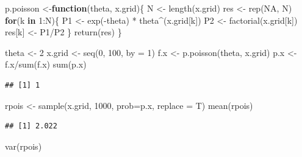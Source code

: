 \documentclass[
  10pt,
  spanish,
]{book}
\newenvironment{Shaded}{\begin{snugshade}}{\end{snugshade}}
\newcommand{\AttributeTok}[1]{\textcolor[rgb]{0.77,0.63,0.00}{#1}}
\newcommand{\ConstantTok}[1]{\textcolor[rgb]{0.00,0.00,0.00}{#1}}
\newcommand{\ControlFlowTok}[1]{\textcolor[rgb]{0.13,0.29,0.53}{\textbf{#1}}}
\newcommand{\DecValTok}[1]{\textcolor[rgb]{0.00,0.00,0.81}{#1}}
\newcommand{\FunctionTok}[1]{\textcolor[rgb]{0.00,0.00,0.00}{#1}}
\newcommand{\NormalTok}[1]{#1}
\newcommand{\OtherTok}[1]{\textcolor[rgb]{0.56,0.35,0.01}{#1}}
\newcommand{\SpecialCharTok}[1]{\textcolor[rgb]{0.00,0.00,0.00}{#1}}
\theoremstyle{definition}
\theoremstyle{definition}
\theoremstyle{definition}
\theoremstyle{definition}
\theoremstyle{remark}
\begin{document}
\begin{Shaded}
\begin{Highlighting}[]
\NormalTok{p.poisson }\OtherTok{\textless{}{-}}\ControlFlowTok{function}\NormalTok{(theta, x.grid)\{}
\NormalTok{  N }\OtherTok{\textless{}{-}} \FunctionTok{length}\NormalTok{(x.grid)}
\NormalTok{  res }\OtherTok{\textless{}{-}} \FunctionTok{rep}\NormalTok{(}\ConstantTok{NA}\NormalTok{, N)}
  \ControlFlowTok{for}\NormalTok{(k }\ControlFlowTok{in} \DecValTok{1}\SpecialCharTok{:}\NormalTok{N)\{}
\NormalTok{    P1 }\OtherTok{\textless{}{-}} \FunctionTok{exp}\NormalTok{(}\SpecialCharTok{{-}}\NormalTok{theta) }\SpecialCharTok{*}\NormalTok{ theta}\SpecialCharTok{\^{}}\NormalTok{(x.grid[k])}
\NormalTok{    P2 }\OtherTok{\textless{}{-}} \FunctionTok{factorial}\NormalTok{(x.grid[k])}
\NormalTok{    res[k] }\OtherTok{\textless{}{-}}\NormalTok{ P1}\SpecialCharTok{/}\NormalTok{P2}
\NormalTok{  \}}
  \FunctionTok{return}\NormalTok{(res)}
\NormalTok{\}}

\NormalTok{theta }\OtherTok{\textless{}{-}} \DecValTok{2}
\NormalTok{x.grid }\OtherTok{\textless{}{-}} \FunctionTok{seq}\NormalTok{(}\DecValTok{0}\NormalTok{, }\DecValTok{100}\NormalTok{, }\AttributeTok{by =} \DecValTok{1}\NormalTok{)}
\NormalTok{f.x }\OtherTok{\textless{}{-}} \FunctionTok{p.poisson}\NormalTok{(theta, x.grid)}
\NormalTok{p.x }\OtherTok{\textless{}{-}}\NormalTok{ f.x}\SpecialCharTok{/}\FunctionTok{sum}\NormalTok{(f.x)}
\FunctionTok{sum}\NormalTok{(p.x)}
\end{Highlighting}
\end{Shaded}

\begin{verbatim}
## [1] 1
\end{verbatim}

\begin{Shaded}
\begin{Highlighting}[]
\NormalTok{rpois }\OtherTok{\textless{}{-}} \FunctionTok{sample}\NormalTok{(x.grid, }\DecValTok{1000}\NormalTok{, }\AttributeTok{prob=}\NormalTok{p.x, }\AttributeTok{replace =}\NormalTok{ T)}
\FunctionTok{mean}\NormalTok{(rpois)}
\end{Highlighting}
\end{Shaded}

\begin{verbatim}
## [1] 2.022
\end{verbatim}

\begin{Shaded}
\begin{Highlighting}[]
\FunctionTok{var}\NormalTok{(rpois)}
\end{Highlighting}
\end{Shaded}
\end{document}
